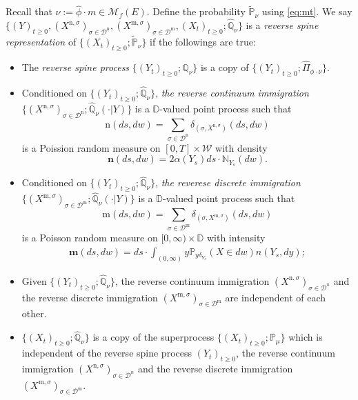 \documentclass[12pt,a4paper]{amsart}
\numberwithin{equation}{section}
\theoremstyle{plain}
\theoremstyle{definition}
\theoremstyle{remark}
\begin{document}
    Recall that $\nu := \hat \phi \cdot m \in \mathcal M_f(E)$. Define the probability $\widetilde {\mathbb P}_\nu$ using \eqref{eq:mt}.
    We say $\{(Y)_{t\geq 0}, (X^{\mathrm n, \sigma})_{\sigma\in \mathcal D^\mathrm n}, (X^{\mathrm m, \sigma})_{\sigma \in \mathcal D^\mathrm m}, (X_t)_{t\geq 0}; \widehat {\mathbb Q}_{\nu}\}$ is a \emph{reverse spine representation} of $\{(X_t)_{t\geq 0}; \widetilde {\mathbb P}_\nu\}$ if the followings are true:
\begin{itemize}
\item
    The \emph{reverse spine process} $\{(Y_t)_{t\geq 0}; \widehat {\mathbb Q}_\nu\}$ is a copy of $\{(Y_t)_{t\geq 0}; \widehat \Pi_{\phi\cdot\nu}\}$.
\item
    Conditioned on $\{(Y_t)_{t\geq 0}; \widehat{\mathbb Q}_\nu\}$, \emph{the reverse continuum immigration} $\{ (X^{\mathrm n,\sigma})_{\sigma \in \mathcal D^\mathrm n}; \widehat{\mathbb Q}_\nu(\cdot |Y)\}$ is a $\mathbb D$-valued point process such that
\[
    \mathrm n(ds,dw)
    = \sum_{\sigma\in \mathcal D^{\mathrm n}} \delta_{(\sigma, X^{\mathrm n,\sigma})}(ds,dw)
\]
	is a Poission random measure on $[0,T]\times \mathcal W$ with density
\[
	\mathbf n(ds,dw)= 2\alpha(Y_s) ds \cdot \mathbb N_{Y_s}(dw).
\]
\item
    Conditioned on $\{(Y_t)_{t\geq 0}; \widehat{\mathbb Q}_\nu\}$, \emph{the reverese discrete immigration} $\{(X^{\mathrm m,\sigma})_{\sigma\in \mathcal D^{\mathrm m}}; \widehat{\mathbb Q}_\nu(\cdot |Y)\}$ is a $\mathbb D$-valued point process such that
\[
    \mathrm m(ds,dw)
    = \sum_{\sigma\in \mathcal D^{\mathrm m}} \delta_{(\sigma, X^{\mathrm m,\sigma})}(ds,dw)
\]
	is a Poisson random measure on $[0,\infty ) \times \mathbb D$ with intensity
\begin{align}\label{eq:meanMeasImmigr}
	\mathbf m(ds,dw)= ds \cdot \int_{(0,\infty)} y \mathbb P_{y\delta_{Y_s}}(X\in dw) n(Y_s,dy);
\end{align}
\item
	Given $\{(Y_t)_{t\geq 0}; \widehat{\mathbb Q}_\nu\}$, the reverse continuum immigration $(X^{\mathrm n,\sigma})_{\sigma \in \mathcal D^n}$ and the reverse discrete immigration $(X^{\mathrm m,\sigma})_{\sigma\in \mathcal D^{\mathrm m}}$ are independent of each other.
\item
	$\{(X_t)_{t\geq 0}; \widehat {\mathbb Q}_\nu\}$ is a copy of the superprocess $\{(X_t)_{t\geq 0}; \mathbb P_\mu\}$ which is independent of the reverse spine process $(Y_t)_{t\geq 0}$, the reverse continuum immigration $(X^{\mathrm n,\sigma})_{\sigma \in \mathcal D^n}$ and the reverse discrete immigration $(X^{\mathrm m,\sigma})_{\sigma\in \mathcal D^{\mathrm m}}$.
\end{itemize}
\end{document}
